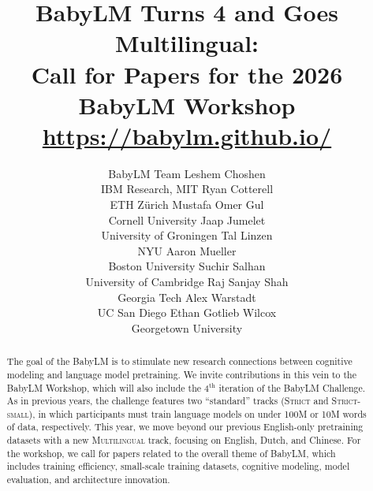 \documentclass[11pt]{article}
\title{BabyLM Turns 4 and Goes Multilingual:\\ Call for Papers for the 2026 BabyLM Workshop \\
 \vspace{0.2cm} \url{https://babylm.github.io/}}
\author{
BabyLM Team
\AND
        Leshem Choshen \\ IBM Research, MIT \And
        Ryan Cotterell \\ ETH Zürich \And
        Mustafa Omer Gul \\ Cornell University \And
        Jaap Jumelet \\ University of Groningen
        \AND
        Tal Linzen \\ NYU \And
        Aaron Mueller \\ Boston University \And
        Suchir Salhan \\ University of Cambridge
        \AND
        Raj Sanjay Shah \\ Georgia Tech \And
        Alex Warstadt \\ UC San Diego \And
        Ethan Gotlieb Wilcox \\ Georgetown University
}
\newcommand{\strict}[1]{\textsc{Strict}}
\newcommand{\strictsmall}[1]{\textsc{Strict-small}}
\newcommand{\multilingual}[1]{\textsc{Multilingual}}
\begin{document}
\maketitle

\begin{abstract}
The goal of the BabyLM is to stimulate new research connections between cognitive modeling and language model pretraining.
We invite contributions in this vein to the BabyLM Workshop, which will also include the 4$^{\text{th}}$ iteration of the BabyLM Challenge.
As in previous years, the challenge features two ``standard'' tracks (\strict{} and \strictsmall{}), in which participants must train language models on under 100M or 10M words of data, respectively.
This year, we move beyond our previous English-only pretraining datasets with a new \multilingual{} track, focusing on English, Dutch, and Chinese.
For the workshop, we call for papers related to the overall theme of BabyLM, which includes training efficiency, small-scale training datasets, cognitive modeling, model evaluation, and architecture innovation.




\end{abstract}
\end{document}
